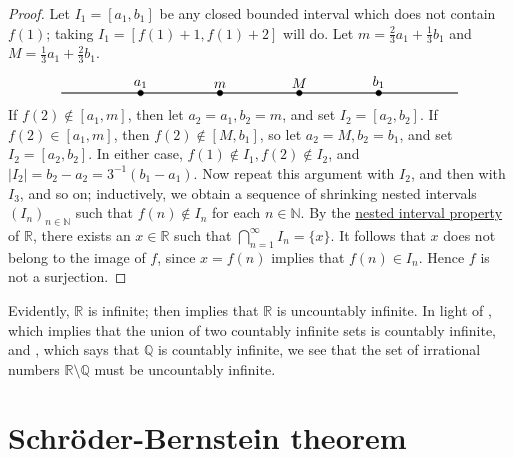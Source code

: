 \documentclass[12pt]{article}
\theoremstyle{definition}
\begin{document}
\begin{proof}
    Let \( I_1 = [a_1, b_1] \) be any closed bounded interval which does not contain \( f(1) \); taking \( I_1 = [f(1) + 1, f(1) + 2] \) will do. Let \( m = \frac{2}{3}a_1 + \frac{1}{3}b_1 \) and \( M = \frac{1}{3}a_1 + \frac{2}{3} b_1 \).
    \[
    \begin{tikzpicture}
        \draw[black, thick] (0, 0) -- (10, 0);
        \filldraw[black] (2, 0) circle (2pt) node[anchor=south]{$a_1$};
        \filldraw[black] (4, 0) circle (2pt) node[anchor=south]{$m$};
        \filldraw[black] (6, 0) circle (2pt) node[anchor=south]{$M$};
        \filldraw[black] (8, 0) circle (2pt) node[anchor=south]{$b_1$};
    \end{tikzpicture}
    \]
    If \( f(2) \not\in [a_1, m] \), then let \( a_2 = a_1, b_2 = m \), and set \( I_2 = [a_2, b_2] \). If \( f(2) \in [a_1, m] \), then \( f(2) \not\in [M, b_1] \), so let \( a_2 = M, b_2 = b_1 \), and set \( I_2 = [a_2, b_2] \). In either case, \( f(1) \not\in I_1, f(2) \not\in I_2 \), and \( |I_2| = b_2 - a_2 = 3^{-1}(b_1 - a_1) \). Now repeat this argument with \( I_2 \), and then with \( I_3 \), and so on; inductively, we obtain a sequence of shrinking nested intervals \( (I_n)_{n \in \mathbb{N}} \) such that \( f(n) \not\in I_n \) for each \( n \in \mathbb{N} \). By the \href{https://lew98.github.io/Mathematics/Nested_interval_property.pdf}{nested interval property} of \( \mathbb{R} \), there exists an \( x \in \mathbb{R} \) such that \( \bigcap_{n=1}^{\infty} I_n = \{ x \} \). It follows that \( x \) does not belong to the image of \( f \), since \( x = f(n) \) implies that \( f(n) \in I_n \). Hence \( f \) is not a surjection.
\end{proof}

Evidently, \( \mathbb{R} \) is infinite;  then implies that \( \mathbb{R} \) is uncountably infinite. In light of , which implies that the union of two countably infinite sets is countably infinite, and , which says that \( \mathbb{Q} \) is countably infinite, we see that the set of irrational numbers \( \mathbb{R} \setminus \mathbb{Q} \) must be uncountably infinite.

\section{Schröder-Bernstein theorem}
\label{sec:schroder-bernstein_theorem}
\end{document}
